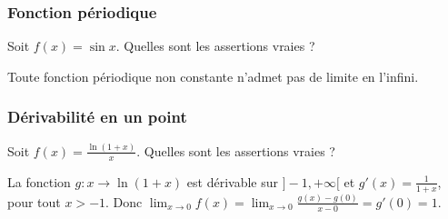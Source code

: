 \subsubsection{Fonction périodique}

\begin{question} 
Soit $f(x)= \sin x$. Quelles sont les assertions vraies ?
\begin{answers}

     
    
    
    

 
\end{answers}
\begin{explanations}
Toute fonction périodique non constante n'admet pas de limite en l'infini.
\end{explanations}

\end{question}



\subsubsection{Dérivabilité en un point}

\begin{question} 
Soit $f(x)= \frac{\ln(1+x)}{x}$. Quelles sont les assertions vraies ?
\begin{answers}

    
    
    
    
\end{answers}
\begin{explanations}
La fonction $g: x\to \ln(1+x)$ est dérivable sur $]-1,+\infty[$  et $g'(x)= \frac{1}{1+x}$, pour tout $x>-1$. Donc  $\lim_{x\to 0}f(x)= \lim_{x\to 0}\frac{g(x)-g(0)}{x-0} = g'(0)=1$.
\end{explanations}

\end{question}


